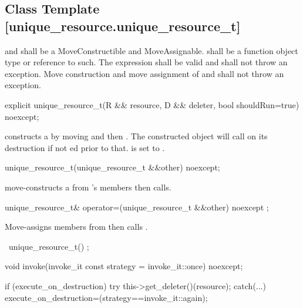 \documentclass[ebook,11pt,article]{memoir}
\begin{document}
\subsection {Class Template  [unique_resource.unique_resource_t]}

\pnum
\requires  {} and  shall be a MoveConstructible and MoveAssignable.
 shall be a function object type or reference to such. 
The expression  shall be valid
and shall not throw an exception.  %
Move construction and move assignment of  and  shall not throw an exception.


\begin{itemdecl}
explicit
unique_resource_t(R && resource, D && deleter, bool shouldRun=true) noexcept;
\end{itemdecl}

\pnum
\effects constructs a  by moving  and then . The constructed object will call  on its destruction if not ed prior to that.  is set to .

\begin{itemdecl}
unique_resource_t(unique_resource_t &&other) noexcept;
\end{itemdecl}

\pnum
\effects move-constructs a  from 's members then calls.

\begin{itemdecl}
unique_resource_t& operator=(unique_resource_t  &&other) noexcept ;
\end{itemdecl}

\pnum
\effects {} Move-assigns members from  then calls .

\begin{itemdecl}
~unique_resource_t() ;
\end{itemdecl}

\pnum
\effects {}

\begin{itemdecl}
void invoke(invoke_it const strategy = invoke_it::once) noexcept;
\end{itemdecl}

\pnum
\effects 
\begin{codeblock}
if (execute_on_destruction) try {
	this->get_deleter()(resource);
} catch(...){}
execute_on_destruction=(strategy==invoke_it::again);
\end{codeblock}
\end{document}
